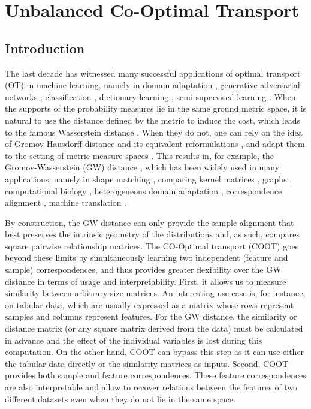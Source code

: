 \section{Unbalanced Co-Optimal Transport}

\subsection{Introduction}

The last decade has witnessed many successful applications of optimal
transport (OT) \citep{Monge81,Kanto42} in machine learning, namely in domain adaptation \citep{Courty16},
generative adversarial networks \citep{Arjovsky17}, classification \citep{Frogner15},
dictionary learning \citep{Rolet16}, semi-supervised learning \citep{Solomon14}. When the
supports of the probability measures lie in the same ground metric space, it is natural to use the distance defined by the metric
to induce the cost, which leads to the famous Wasserstein distance \citep{Villani03}. When they do not, one can rely on the idea of Gromov-Hausdorff distance \citep{Gromov81} and its equivalent reformulations \citep{Gromov99,Kalton99,Burago01}, and adapt them to the setting of metric measure spaces \citep{Gromov99}. This results in, for example, the Gromov-Wasserstein
(GW) distance \citep{Memoli07,Memoli11,Sturm12}, which has been widely used in many applications, namely in shape matching \citep{Memoli11},
comparing kernel matrices \citep{Peyre16}, graphs \citep{Vayer19b,Xu19,Xu19b},
computational biology \citep{Demetci22}, heterogeneous domain adaptation \citep{Yan18},
correspondence alignment \citep{Solomon16}, machine translation \citep{Melis18}.

By construction, the GW distance can only provide the sample alignment that best preserves the intrinsic geometry of the distributions and, as such, compares square pairwise relationship matrices. The CO-Optimal transport (COOT) \citep{Redko20,Chowdhury21b} goes beyond these limits by simultaneously learning two independent (feature and sample) correspondences, and thus provides greater flexibility over the GW distance in terms of usage and interpretability. First, it allows us to measure similarity between arbitrary-size matrices. An interesting use case is, for instance, on tabular data, which are usually expressed as a matrix whose rows represent samples and columns represent features. For the GW distance,
the similarity or distance matrix (or any square matrix derived from the data)
must be calculated in advance and the effect of the individual variables is lost during this computation. On the other hand, COOT can bypass this step as it can use either the tabular data directly or the similarity matrices as inputs. Second, COOT provides both sample and feature correspondences. These feature correspondences are also interpretable and allow to recover relations between the features of two different datasets even when they do not lie in the same space.

